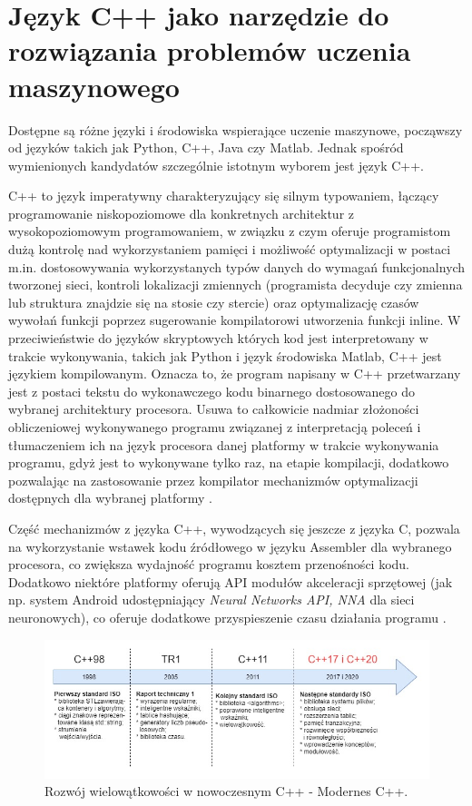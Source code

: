 \section{Język C++ jako narzędzie do rozwiązania problemów uczenia maszynowego}

Dostępne są różne języki i środowiska wspierające uczenie maszynowe, począwszy od języków takich jak Python, C++, Java czy Matlab. Jednak spośród wymienionych kandydatów szczególnie istotnym wyborem jest język C++. 

C++ to język imperatywny charakteryzujący się silnym typowaniem, łączący programowanie niskopoziomowe dla konkretnych architektur z wysokopoziomowym programowaniem, w związku z czym oferuje programistom dużą kontrolę nad wykorzystaniem pamięci i możliwość optymalizacji w postaci m.in. dostosowywania wykorzystanych typów danych do wymagań funkcjonalnych tworzonej sieci, kontroli lokalizacji zmiennych (programista decyduje czy zmienna lub struktura znajdzie się na stosie czy stercie) oraz optymalizację czasów wywołań funkcji poprzez sugerowanie kompilatorowi utworzenia funkcji inline. W przeciwieństwie do języków skryptowych których kod jest interpretowany w trakcie wykonywania, takich jak Python i język środowiska Matlab, C++ jest językiem kompilowanym. Oznacza to, że program napisany w C++ przetwarzany jest z postaci tekstu do wykonawczego kodu binarnego dostosowanego do wybranej architektury procesora. Usuwa to całkowicie nadmiar złożoności obliczeniowej wykonywanego programu związanej z interpretacją poleceń i tłumaczeniem ich na język procesora danej platformy w trakcie wykonywania programu, gdyż jest to wykonywane tylko raz, na etapie kompilacji, dodatkowo pozwalając na zastosowanie przez kompilator mechanizmów optymalizacji dostępnych dla wybranej platformy \cite{cpp_char}. 

Część mechanizmów z języka C++, wywodzących się jeszcze z języka C, pozwala na wykorzystanie wstawek kodu źródłowego w języku Assembler dla wybranego procesora, co zwiększa wydajność programu kosztem przenośności kodu. Dodatkowo niektóre platformy oferują API modułów akceleracji sprzętowej (jak np. system Android udostępniający \textit{Neural Networks API, NNA} dla sieci neuronowych), co oferuje dodatkowe przyspieszenie czasu działania programu \cite{android_nna}.

\begin{figure}[!ht]
    \centering
    \includegraphics[width=150mm]{Rysunki/Rozdzial2/multithreading.jpg}
    \caption{Rozwój wielowątkowości w nowoczesnym C++ - Modernes C++.}
    \label{fig:cpp_history}
\end{figure}

